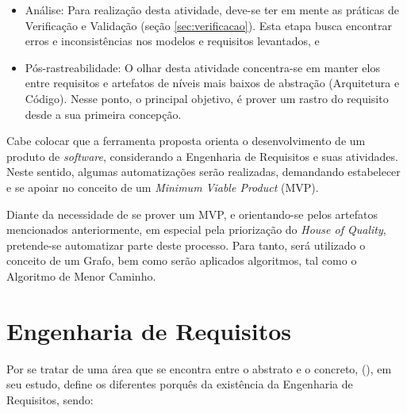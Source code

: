 \begin{itemize}
    \item Análise: Para realização desta atividade, deve-se ter em mente as práticas de Verificação e Validação (seção \ref{sec:verificacao}). Esta etapa busca encontrar erros e inconsistências nos modelos e requisitos levantados, e
    \item Pós-rastreabilidade: O olhar desta atividade concentra-se em manter elos entre requisitos e artefatos de níveis mais baixos de abstração (Arquitetura e Código). Nesse ponto, o principal objetivo, é prover um rastro do requisito desde a sua primeira concepção.
\end{itemize}

Cabe colocar que a ferramenta proposta orienta o desenvolvimento de um produto de \textit{software}, considerando a Engenharia de Requisitos e suas atividades. Neste sentido, algumas automatizações serão realizadas, demandando estabelecer e se apoiar no conceito de um \textit{Minimum Viable Product} (MVP).

Diante da necessidade de se prover um MVP, e orientando-se pelos artefatos mencionados anteriormente, em especial pela priorização do \textit{House of Quality}, pretende-se automatizar parte deste processo. Para tanto, será utilizado o conceito de um Grafo, bem como serão aplicados algoritmos, tal como o Algoritmo de Menor Caminho.

\section{Engenharia de Requisitos}

\label{sec:eng_requisitos_ex}

Por se tratar de uma área que se encontra entre o abstrato e o concreto, (\citeyear{westfall_5w2h}), em seu estudo, define os diferentes porquês da existência da Engenharia de Requisitos, sendo:

